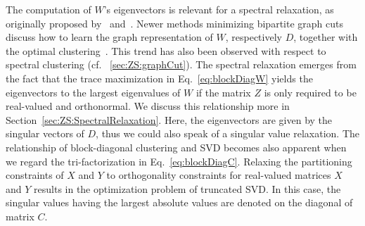 The computation of $W$'s eigenvectors is relevant for a spectral relaxation, as originally proposed by~\cite{zha2001bipartite} and~\cite{dhillon2001co}. Newer methods minimizing bipartite graph cuts discuss how to learn the graph representation of $W$, respectively $D$, together with the optimal clustering~\citep{nie2017learning}. This trend has also been observed with respect to spectral clustering (cf. \@Section~\ref{sec:ZS:graphCut}).
The spectral relaxation emerges from the fact that the trace maximization in Eq.~\eqref{eq:blockDiagW} yields the eigenvectors to the largest eigenvalues of $W$ if the matrix $Z$ is only required to be real-valued and orthonormal. We discuss this relationship more in Section~\ref{sec:ZS:SpectralRelaxation}. Here, the eigenvectors are given by the singular vectors of $D$, thus we could also speak of a singular value relaxation. The relationship of block-diagonal clustering and SVD becomes also apparent when we regard the tri-factorization in Eq.~\eqref{eq:blockDiagC}. Relaxing the partitioning constraints of $X$ and $Y$ to orthogonality constraints for real-valued matrices $X$ and $Y$ results in the optimization problem of truncated SVD. In this case, the singular values having the largest absolute values are denoted on the diagonal of matrix $C$.
